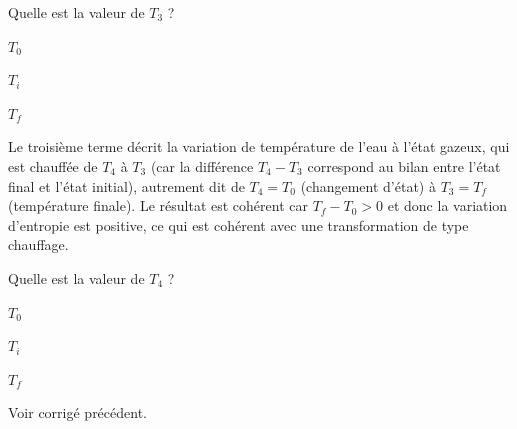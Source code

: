 
\begin{enonce}	
	Quelle est la valeur de $T_3$ ?
	\begin{listeQCM4Colonnes}
	\item $T_0$
	\item $T_i$
	\item $T_f$
	\end{listeQCM4Colonnes}
\end{enonce}

\reponse{\reponseC}

\begin{corrige}
Le troisième terme décrit la variation de température de l'eau à l'état gazeux, qui est chauffée de $T_4$ à $T_3$ (car la différence $T_4-T_3$ correspond au bilan entre l'état final et l'état initial), autrement dit de $T_4=T_0$ (changement d'état) à $T_3=T_f$ (température finale). Le résultat est cohérent car $T_f-T_0>0$ et donc la variation d'entropie est positive, ce qui est cohérent avec une transformation de type chauffage.
\end{corrige}




\begin{enonce}	
	Quelle est la valeur de $T_4$ ?
	\begin{listeQCM4Colonnes}
	\item $T_0$
	\item $T_i$
	\item $T_f$
	\end{listeQCM4Colonnes}
\end{enonce}

\reponse{\reponseA}

\begin{corrige}
Voir corrigé précédent.
\end{corrige}




\bigskip
\hauteurLargeurCadreReponse		{7mm}{3cm}


\pauseEntrainement

